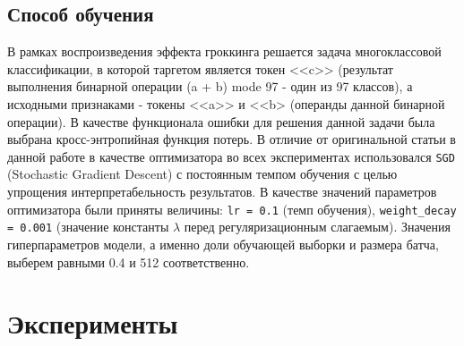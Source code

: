 \documentclass{article}
\begin{document}
\subsection{Способ обучения}
В рамках воспроизведения эффекта гроккинга решается задача многоклассовой классификации, в которой таргетом является токен <<c>> (результат выполнения бинарной операции (a + b) mode 97 - один из 97 классов), а исходными признаками - токены <<a>> и <<b> (операнды данной бинарной операции). В качестве функционала ошибки для решения данной задачи была выбрана кросс-энтропийная функция потерь.
В отличие от оригинальной статьи в данной работе в качестве оптимизатора во всех экспериментах использовался \verb|SGD| (Stochastic Gradient Descent) с постоянным темпом обучения с целью упрощения интерпретабельность результатов. В качестве значений параметров оптимизатора были приняты величины: \verb|lr = 0.1| (темп обучения), \verb|weight_decay = 0.001| (значение константы $\lambda$ перед регуляризационным слагаемым). Значения гиперпараметров модели, а именно доли обучающей выборки и размера батча, выберем равными 0.4 и 512 соответственно.
\section{Эксперименты}
\end{document}
